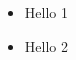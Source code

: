 \documentclass{article}
\begin{document}
\begin{itemize}[leftmargin=*]
\item Hello 1
\item Hello 2
\end{itemize}
\end{document}
